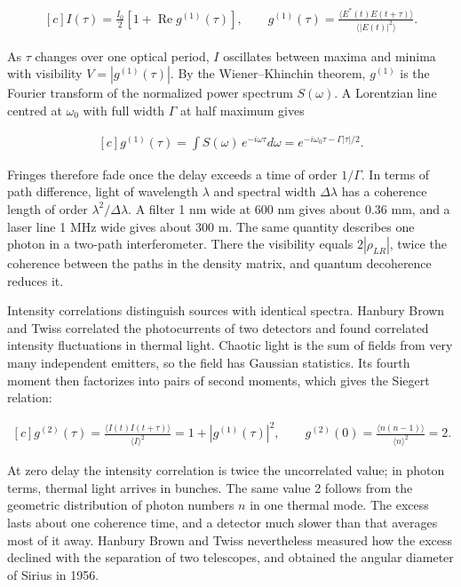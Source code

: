 \documentclass[11pt,oneside]{book}
\newenvironment{centeredalign}{\[\begin{gathered}[c]}{\end{gathered}\]}
\begin{document}
\begin{centeredalign}
I(\tau)=\frac{I_0}{2}\left[1+\operatorname{Re}g^{(1)}(\tau)\right],\qquad
g^{(1)}(\tau)=\frac{\langle E^*(t)E(t+\tau)\rangle}{\langle|E(t)|^2\rangle}.
\end{centeredalign}

As \(\tau\) changes over one optical period, \(I\) oscillates between maxima and minima with visibility \(V=|g^{(1)}(\tau)|\). By the Wiener--Khinchin theorem, \(g^{(1)}\) is the Fourier transform of the normalized power spectrum \(S(\omega)\). A Lorentzian line centred at \(\omega_0\) with full width \(\Gamma\) at half maximum gives

\begin{centeredalign}
g^{(1)}(\tau)=\int S(\omega)\,e^{-i\omega\tau}d\omega=e^{-i\omega_0\tau-\Gamma|\tau|/2}.
\end{centeredalign}

Fringes therefore fade once the delay exceeds a time of order \(1/\Gamma\). In terms of path difference, light of wavelength \(\lambda\) and spectral width \(\Delta\lambda\) has a coherence length of order \(\lambda^2/\Delta\lambda\). A filter 1 nm wide at 600 nm gives about 0.36 mm, and a laser line 1 MHz wide gives about 300 m. The same quantity describes one photon in a two-path interferometer. There the visibility equals \(2|\rho_{LR}|\), twice the coherence between the paths in the density matrix, and quantum decoherence reduces it.

Intensity correlations distinguish sources with identical spectra. Hanbury Brown and Twiss correlated the photocurrents of two detectors and found correlated intensity fluctuations in thermal light. Chaotic light is the sum of fields from very many independent emitters, so the field has Gaussian statistics. Its fourth moment then factorizes into pairs of second moments, which gives the Siegert relation:

\begin{centeredalign}
g^{(2)}(\tau)=\frac{\langle I(t)I(t+\tau)\rangle}{\langle I\rangle^2}=1+|g^{(1)}(\tau)|^2,
\qquad g^{(2)}(0)=\frac{\langle n(n-1)\rangle}{\langle n\rangle^2}=2.
\end{centeredalign}

At zero delay the intensity correlation is twice the uncorrelated value; in photon terms, thermal light arrives in bunches. The same value 2 follows from the geometric distribution of photon numbers \(n\) in one thermal mode. The excess lasts about one coherence time, and a detector much slower than that averages most of it away. Hanbury Brown and Twiss nevertheless measured how the excess declined with the separation of two telescopes, and obtained the angular diameter of Sirius in 1956.
\end{document}
